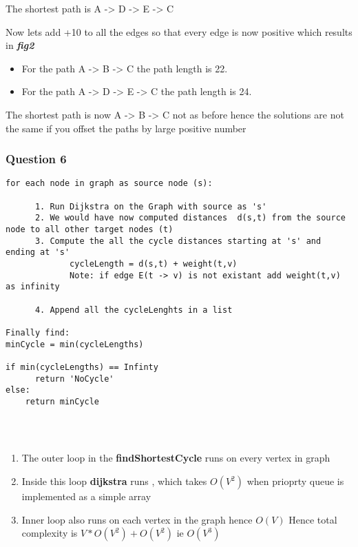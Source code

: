 \documentclass[11pt]{article}
\providecommand{\tightlist}{%
      \setlength{\itemsep}{0pt}\setlength{\parskip}{0pt}}
\begin{document}
The shortest path is A -\textgreater{} D -\textgreater{} E
-\textgreater{} C

Now lets add +10 to all the edges so that every edge is now positive
which results in \textbf{\emph{fig2}}

\begin{itemize}
\tightlist
\item
  For the path A -\textgreater{} B -\textgreater{} C the path length is
  22.
\item
  For the path A -\textgreater{} D -\textgreater{} E -\textgreater{} C
  the path length is 24.
\end{itemize}

The shortest path is now A -\textgreater{} B -\textgreater{} C not as
before hence the solutions are not the same if you offset the paths by
large positive number

    \subsubsection{Question 6}\label{question-6}

    \begin{verbatim}
for each node in graph as source node (s):

      1. Run Dijkstra on the Graph with source as 's'
      2. We would have now computed distances  d(s,t) from the source node to all other target nodes (t)
      3. Compute the all the cycle distances starting at 's' and ending at 's'
             cycleLength = d(s,t) + weight(t,v)
             Note: if edge E(t -> v) is not existant add weight(t,v) as infinity
      
      4. Append all the cycleLenghts in a list
  
Finally find:
minCycle = min(cycleLengths)

if min(cycleLengths) == Infinty 
      return 'NoCycle'
else:
    return minCycle
      
            
      
\end{verbatim}

    \begin{enumerate}
\def\labelenumi{\arabic{enumi}.}
\tightlist
\item
  The outer loop in the \textbf{findShortestCycle} runs on every vertex
  in graph
\item
  Inside this loop \textbf{dijkstra} runs , which takes \(O(V^2)\) when
  prioprty queue is implemented as a simple array
\item
  Inner loop also runs on each vertex in the graph hence \(O(V)\) Hence
  total complexity is \(V*O(V^2) + O(V^2)\) ie \(O(V^3)\)
\end{enumerate}
\end{document}

